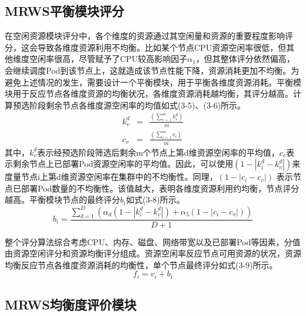 \subsection{MRWS平衡模块评分}
在空闲资源模块评分中，各个维度的资源通过其空闲量和资源的重要程度影响评分，这会导致各维度资源利用不均衡。比如某个节点CPU资源空闲率很低，但其他维度空闲率很高，尽管赋予了CPU较高影响因子\begin{math}\alpha_{1}\end{math}，但其整体评分依然偏高，会继续调度Pod到该节点上，这就造成该节点性能下降，资源消耗更加不均衡。为避免上述情况的发生，需要设计一个平衡模块，用于平衡各维度资源消耗。平衡模块用于反应节点各维度资源的均衡状况，各维度资源消耗越均衡，其评分越高。计算预选阶段剩余节点各维度源空闲率的均值如式(3-5)、(3-6)所示。
\begin{eqnarray}
k_{v}^{d} &=& \frac{(\sum_{i=1}^{m}k_{i}^{d})}{m} \\
c_{v} &=& \frac{(\sum_{i=1}^{m}c_{i})}{m}
\end{eqnarray}
其中，\begin{math}k_{v}^{d}\end{math}表示经预选阶段筛选后剩余m个节点上第d维资源空闲率的平均值，\begin{math}c_{v}\end{math}表示剩余节点上已部署Pod资源空闲率的平均值。因此，可以使用\begin{math}(1-\left |k_{i}^{d}-k_{v}^{d}\right |)\end{math}来度量节点i上第d维资源空闲率在集群中的不均衡性。同理，\begin{math}(1-\left |c_{i}-c_{v}\right|)\end{math}
表示节点已部署Pod数量的不均衡性。该值越大，表明各维度资源利用约均衡，节点评分越高。平衡模块节点的最终评分\begin{math}b_{i}\end{math}如式(3-8)所示。
\begin{equation}
b_{i} = \frac{\sum_{d=1}^{D}(\alpha_{d}(1-\left |k_{i}^{d}-k_{v}^{d}\right|)+\alpha_{5}(1-\left |c_{i}-c_{v}\right|))}{D+1}
\end{equation}

整个评分算法综合考虑CPU、内存、磁盘、网络带宽以及已部署Pod等因素，分值由资源空闲评分和资源均衡评分组成。资源空闲率反应节点可用资源的状况，资源均衡反应节点各维度资源消耗的均衡性，单个节点最终评分如式(3-9)所示。
\begin{equation}
f_{i} = v_{i}+b_{i}
\end{equation}

\subsection{MRWS均衡度评价模块}

